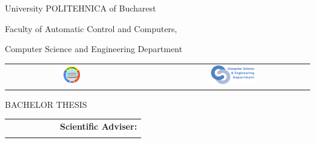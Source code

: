 \begin{titlepage}
	\begin{center}
		{\Large University POLITEHNICA of Bucharest}
		\par\vspace*{2mm}
		{\Large Faculty of Automatic Control and Computers,
		
		Computer Science and Engineering Department}
		\par\vspace*{3mm}
		\begin{table}[h]
        	\begin{center}
				\begin{tabular}{cccc}
                    \includegraphics[width=0.13\textwidth]{src/img/branding/upb}
					& & &
					\includegraphics[width=0.30\textwidth]{src/img/branding/cs}
            	\end{tabular}
			\end{center}
		\end{table}
		
		\par\vspace*{35mm}
		{\Huge BACHELOR THESIS}
		\par\vspace*{15mm}
		{\Huge \VARtitleen}
		\par\vspace*{15mm}
		{\LARGE \VARauthor}
		\par\vspace*{15mm}
		\begin{table}[h]
        	\begin{center}
				\hskip3.0cm	\begin{tabular}{ccccccr}
				
				\vspace*{1mm} &&&&&& \Large \textbf{\Large  Scientific Adviser:} \\
					 &&&&&&  \Large \VARadviser
				\end{tabular}
			\end{center}
		\end{table}

		\par\vspace*{30mm}
		\Large \VARtitlefooteren
	\end{center}
\end{titlepage}
